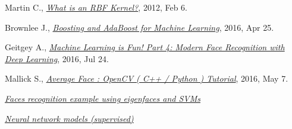 \documentclass{article}
\begin{document}
\begin{thebibliography}{20}
	Martin C.,
	\emph{\href{https://charlesmartin14.wordpress.com/2012/02/06/kernels_part_1/}{What is an RBF Kernel?}},
	2012, Feb 6.
	
	Brownlee J.,
	\emph{\href{http://machinelearningmastery.com/boosting-and-adaboost-for-machine-learning/}{Boosting and AdaBoost for Machine Learning}},
	2016, Apr 25.
	
	Geitgey A.,
	\emph{\href{https://medium.com/@ageitgey/machine-learning-is-fun-part-4-modern-face-recognition-with-deep-learning-c3cffc121d78\#.e531kjh1o}{Machine Learning is Fun! Part 4: Modern Face Recognition with Deep Learning}},
	2016, Jul 24.
	
	Mallick S.,
	\emph{\href{http://www.learnopencv.com/average-face-opencv-c-python-tutorial/}{Average Face : OpenCV ( C++ / Python ) Tutorial}},
	2016, May 7.
	
	\emph{\href{http://scikit-learn.org/stable/auto_examples/applications/face_recognition.html}{Faces recognition example using eigenfaces and SVMs}}
	
	\emph{\href{scikit-learn.org/stable/modules/neural_networks_supervised.html}{Neural network models (supervised)}}
\end{thebibliography}
\end{document}
